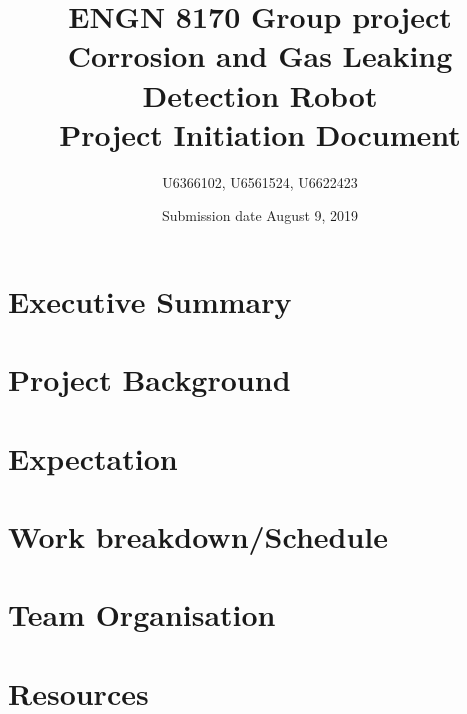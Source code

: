 \documentclass[a4paper]{article}
\title{ENGN 8170 Group project\\ Corrosion and Gas Leaking Detection Robot\\ Project Initiation Document}
\author{U6366102, U6561524, U6622423}
\date{Submission date August 9, 2019}
\begin{document}
\maketitle
\newpage
\tableofcontents
\newpage
{}
\section{Executive Summary}
\section {Project Background}

\section{Expectation}

\section{Work breakdown/Schedule}

\section{Team Organisation}

\section {Resources}
\end{document}
